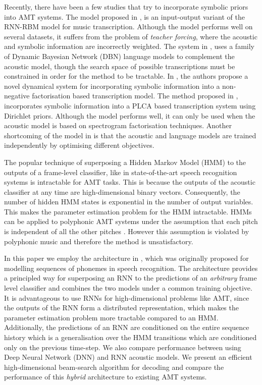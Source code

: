 \documentclass{article}
\begin{document}
Recently, there have been a few studies that try to incorporate symbolic priors into AMT systems. The model proposed in \cite{boulanger2013high}, is an input-output variant of the RNN-RBM model for music transcription. Although the model performs well on several datasets, it suffers from the problem of \emph{teacher forcing}, where the acoustic and symbolic information are incorrectly weighted. The system in \cite{raczynski2013dynamic}, uses a family of Dynamic Bayesian Network (DBN) language models to complement the acoustic model, though the search space of possible transcriptions must be constrained in order for the method to be tractable. In \cite{simsekli2013hierarchical}, the authors propose a novel dynamical system for incorporating symbolic information into a non-negative factorisation based transcription model. The method proposed in \cite{sigtiarnn}, incorporates symbolic information into a PLCA based transcription system using Dirichlet priors. Although the model performs well, it can only be used when the acoustic model is based on spectrogram factorisation techniques. Another shortcoming of the model in \cite{sigtiarnn} is that the acoustic and language models are trained independently by optimising different objectives. 

The popular technique of superposing a Hidden Markov Model (HMM) to the outputs of a frame-level classifier, like in state-of-the-art speech recognition systems \cite{hinton2012deep} is intractable for AMT tasks. This is because the outputs of the acoustic classifier at any time are high-dimensional binary vectors. Consequently, the number of hidden HMM states is exponential in the number of output variables. This makes the parameter estimation problem for the HMM intractable. HMMs can be applied to polyphonic AMT systems under the assumption that each pitch is independent of all the other pitches \cite{poliner2006discriminative}. However this assumption is violated by polyphonic music and therefore the method is unsatisfactory. 

In this paper we employ the architecture in \cite{boulangerphone}, which was originally proposed for modelling sequences of phonemes in speech recognition. The architecture provides a principled way for superposing an RNN to the predictions of an \emph{arbitrary} frame level classifier and combines the two models under a common training objective. It is advantageous to use RNNs for high-dimensional problems like AMT, since the outputs of the RNN form a distributed representation, which makes the parameter estimation problem more tractable compared to an HMM. Additionally, the predictions of an RNN are conditioned on the entire sequence history which is a generalisation over the HMM transitions which are conditioned only on the previous time-step. We also compare performance between using Deep Neural Network (DNN) and RNN acoustic models. We present an efficient high-dimensional beam-search algorithm for decoding and compare the performance of this \emph{hybrid} architecture to existing AMT systems.
\end{document}

